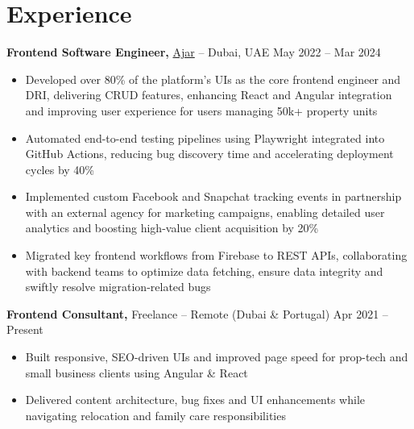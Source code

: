 \documentclass[10pt,letterpaper]{article}
\begin{document}

\section*{Experience}

\textbf{Frontend Software Engineer,} \href{https://joinajar.com/}{Ajar} -- Dubai, UAE \hfill May 2022 -- Mar 2024 \\
\vspace{-1pt}
\begin{itemize}
  \item Developed over 80\% of the platform's UIs as the core frontend engineer and DRI, delivering CRUD features, enhancing React and Angular integration and improving user experience for users managing 50k+ property units
  \item Automated end-to-end testing pipelines using Playwright integrated into GitHub Actions, reducing bug discovery time and accelerating deployment cycles by 40\%
  \item Implemented custom Facebook and Snapchat tracking events in partnership with an external agency for marketing campaigns, enabling detailed user analytics and boosting high-value client acquisition by 20\%
  \item Migrated key frontend workflows from Firebase to REST APIs, collaborating with backend teams to optimize data fetching, ensure data integrity and swiftly resolve migration-related bugs
\end{itemize}

\textbf{Frontend Consultant,} Freelance -- Remote (Dubai \& Portugal) \hfill Apr 2021 -- Present \\
\vspace{-1pt}
\begin{itemize}
  \item Built responsive, SEO-driven UIs and improved page speed for prop-tech and small business clients using Angular \& React
  \item Delivered content architecture, bug fixes and UI enhancements while navigating relocation and family care responsibilities
\end{itemize}
\end{document}
